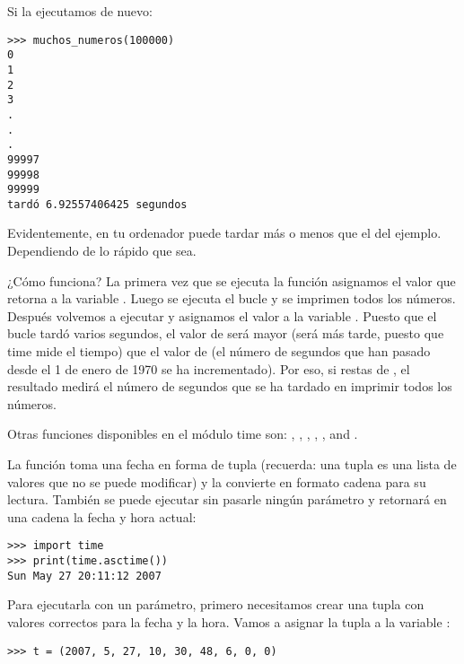 \noindent
Si la ejecutamos de nuevo:

\begin{listingignore}
\begin{verbatim}
>>> muchos_numeros(100000)
0
1
2
3
.
.
.
99997
99998
99999
tardó 6.92557406425 segundos
\end{verbatim}
\end{listingignore}

\noindent

Evidentemente, en tu ordenador puede tardar más o menos que el del ejemplo. Dependiendo de lo rápido que sea.

¿Cómo funciona?   La primera vez que se ejecuta la función  asignamos el valor que retorna a la variable .  Luego se ejecuta el bucle y se imprimen todos los números.  Después volvemos a ejecutar  y asignamos el valor a la variable .  Puesto que el bucle tardó varios segundos, el valor de  será mayor (será más tarde, puesto que time mide el tiempo) que el valor de  (el número de segundos que han pasado desde el 1 de enero de 1970 se ha incrementado).  Por eso, si restas  de , el resultado medirá el número de segundos que se ha tardado en imprimir todos los números.

Otras funciones disponibles en el módulo time son: , , , , , and .

La función  toma una fecha en forma de tupla (recuerda: una tupla es una lista de valores que no se puede modificar) y la convierte en formato cadena para su lectura.   También se puede ejecutar sin pasarle ningún parámetro y retornará en una cadena la fecha y hora actual:

\begin{listingignore}
\begin{verbatim}
>>> import time
>>> print(time.asctime())
Sun May 27 20:11:12 2007
\end{verbatim}
\end{listingignore}

\noindent
Para ejecutarla con un parámetro, primero necesitamos crear una tupla con valores correctos para la fecha y la hora.   Vamos a asignar la tupla a la variable :

\begin{listing}
\begin{verbatim}
>>> t = (2007, 5, 27, 10, 30, 48, 6, 0, 0)
\end{verbatim}
\end{listing}

